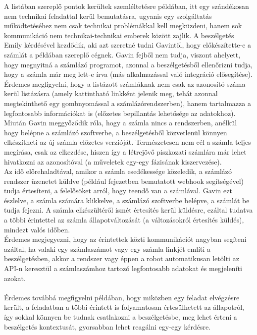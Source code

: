 A listában szereplő pontok kerültek szemléltetésre  példában, itt egy szándékosan nem technikai feladattal kerül bemutatásra, ugyanis egy szolgáltatás működtetéséhez nem csak technikai problémákkal kell megküzdeni, hanem sok kommunikáció nem technikai-technikai emberek között zajlik.
A beszélgetés Emily kérdésével kezdődik, aki azt szeretné tudni Gavintől, hogy előkészítette-e a számlát a példában szereplő cégnek. Gavin fejből nem tudja, viszont ahelyett, hogy megnyitná a számlázó programot, azonnal a beszélgetésből ellenőrizni tudja, hogy a számla már meg lett-e írva (más alkalmazással való integráció elősegítése). Érdemes megfigyelni, hogy a listázott számláknak nem csak az azonosító száma kerül listázásra (amely kattintható linkként jelenik meg, tehát azonnal megtekinthető egy gombnyomással a számlázórendszerben), hanem tartalmazza a legfontosabb információkat is (előzetes bepillantás lehetősége az adatokhoz).\hfill\\
Miután Gavin meggyőződik róla, hogy a számla nincs a rendszerben, anélkül hogy belépne a számlázó szoftverbe, a beszélgetésből közvetlenül könnyen elkészítheti az új számla előzetes verzióját. Természetesen nem cél a számla teljes megírása, csak az elkezdése, hiszen így a létrejövő piszkozati számlára már lehet hivatkozni az azonosítóval (a műveletek egy-egy fázisának kiszervezése).\hfill\\
Az idő előrehaladtával, amikor a számla esedékessége közeledik, a számlázó rendszer üzenetet küldve (például  fejezetben bemutatott webhook segítségével) tudja értesíteni, a felelősöket arról, hogy teendő van a számlával. Gavin ezt észlelve, a számla számára klikkelve, a számlázó szoftverbe belépve, a számlát be tudja fejezni. A számla elkészültéről ismét értesítés kerül küldésre, ezáltal tudatva a többi érintettel az számla állapotváltozását (a változásokról értesítés küldés), mindezt valós időben.\hfill\\
Érdemes megjegyezni, hogy az érintettek közti kommunikációt nagyban segíteni azáltal, ha valaki egy számlaszámot vagy egy számla linkjét említi a beszélgetésben, akkor a rendszer vagy éppen a robot automatikusan letölti az API-n keresztül a számlaszámhoz tartozó legfontosabb adatokat és megjeleníti azokat.\\
\hfill\\
Érdemes továbbá megfigyelni  példában, hogy miközben egy feladat elvégzésre került, a feladatban a többi érintett is folyamatosan értesülhetett az állapotról, így sokkal könnyen be tudnak csatlakozni a beszélgetésbe, meg lehet érteni a beszélgetés kontextusát, gyorsabban lehet reagálni egy-egy kérdésre.
